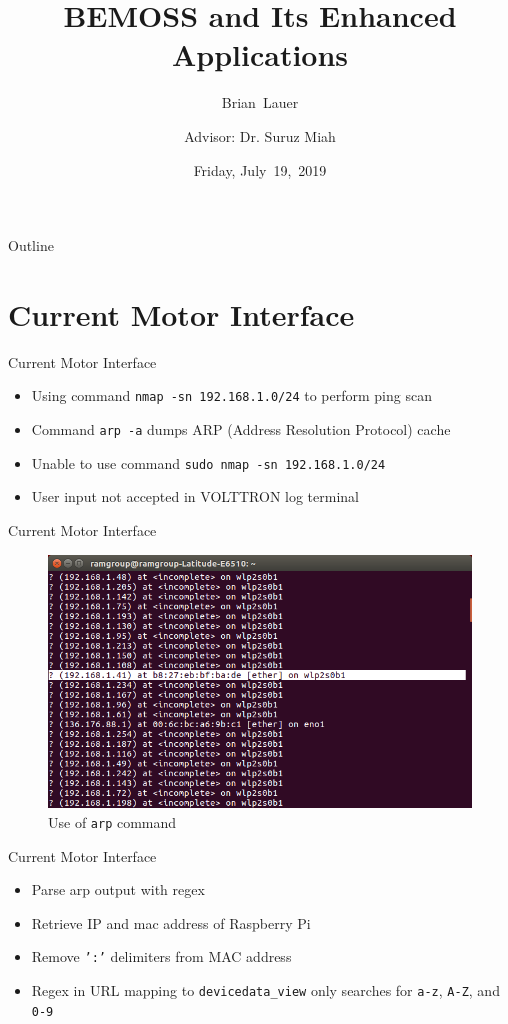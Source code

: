 \documentclass{beamer}
\title[DC Motor Progress]{BEMOSS and Its Enhanced Applications}
\author[B.~Lauer]{Brian~Lauer \\\and
Advisor: Dr. Suruz Miah}
\institute[Bradley University] %
{
  Department of Electrical and Computer Engineering\\
  Bradley University\\
  1501 W. Bradley Avenue\\
  Peoria, IL, 61625, USA
}
\date[July~19,~2019]{Friday, July~19,~2019}
\begin{document}
\begin{frame}
  \titlepage
\end{frame}

\begin{frame}{Outline}
  \tableofcontents
\end{frame}

\section{Current Motor Interface}

\begin{frame}{Current Motor Interface}{}
	\begin{itemize}
		\item Using command \texttt{nmap -sn 192.168.1.0/24} to perform ping scan
		\item Command \texttt{arp -a} dumps ARP (Address Resolution Protocol) cache
		\item Unable to use command \texttt{sudo nmap -sn 192.168.1.0/24}
		\item User input not accepted in VOLTTRON log terminal
	\end{itemize}
\end{frame}

\begin{frame}{Current Motor Interface}{}
	\begin{figure}
		\includegraphics[scale=0.4]{../figs/arpoutput.png}
		\caption{Use of \texttt{arp} command}
	\end{figure}
\end{frame}

\begin{frame}{Current Motor Interface}{}
	\begin{itemize}
		\item Parse arp output with regex
		\item Retrieve IP and mac address of Raspberry Pi
		\item Remove \texttt{':'} delimiters from MAC address
		\item Regex in URL mapping to \texttt{devicedata\_view} only searches for \texttt{a-z}, \texttt{A-Z}, and \texttt{0-9}
	\end{itemize}
\end{frame}
\end{document}
